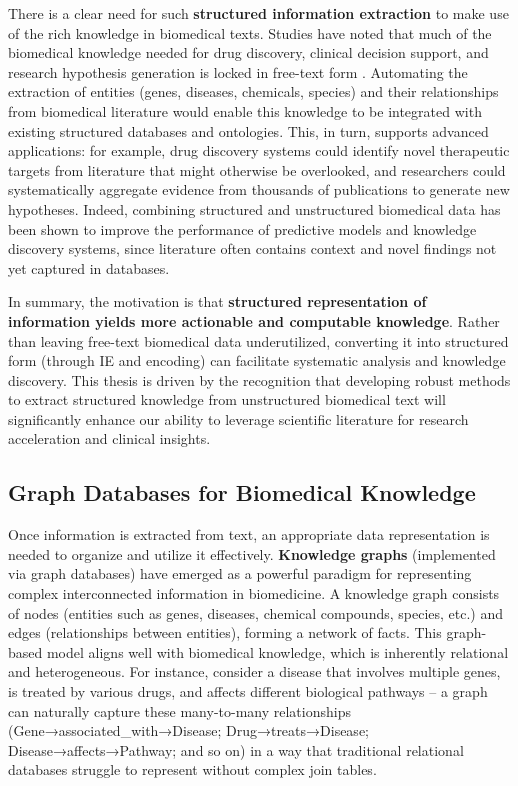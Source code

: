 There is a clear need for such \textbf{structured information extraction} to make use of the rich knowledge in biomedical texts. Studies have noted that much of the biomedical knowledge needed for drug discovery, clinical decision support, and research hypothesis generation is locked in free-text form \parencite{Liu2024}. Automating the extraction of entities (genes, diseases, chemicals, species) and their relationships from biomedical literature would enable this knowledge to be integrated with existing structured databases and ontologies. This, in turn, supports advanced applications: for example, drug discovery systems could identify novel therapeutic targets from literature that might otherwise be overlooked, and researchers could systematically aggregate evidence from thousands of publications to generate new hypotheses. Indeed, combining structured and unstructured biomedical data has been shown to improve the performance of predictive models and knowledge discovery systems, since literature often contains context and novel findings not yet captured in databases.

In summary, the motivation is that \textbf{structured representation of information yields more actionable and computable knowledge}. Rather than leaving free-text biomedical data underutilized, converting it into structured form (through IE and encoding) can facilitate systematic analysis and knowledge discovery. This thesis is driven by the recognition that developing robust methods to extract structured knowledge from unstructured biomedical text will significantly enhance our ability to leverage scientific literature for research acceleration and clinical insights.

\subsection{Graph Databases for Biomedical Knowledge}

Once information is extracted from text, an appropriate data representation is needed to organize and utilize it effectively. \textbf{Knowledge graphs} (implemented via graph databases) have emerged as a powerful paradigm for representing complex interconnected information in biomedicine. A knowledge graph consists of nodes (entities such as genes, diseases, chemical compounds, species, etc.) and edges (relationships between entities), forming a network of facts. This graph-based model aligns well with biomedical knowledge, which is inherently relational and heterogeneous. For instance, consider a disease that involves multiple genes, is treated by various drugs, and affects different biological pathways – a graph can naturally capture these many-to-many relationships (Gene→associated\_with→Disease; Drug→treats→Disease; Disease→affects→Pathway; and so on) in a way that traditional relational databases struggle to represent without complex join tables.

